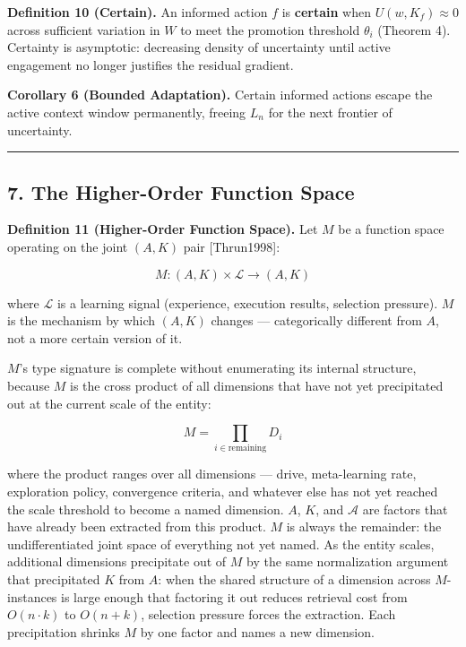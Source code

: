 \documentclass[
]{article}
\begin{document}
\textbf{Definition 10 (Certain).} An informed action \(f\) is
\textbf{certain} when \(U(w, K_f) \approx 0\) across sufficient
variation in \(W\) to meet the promotion threshold \(\theta_i\) (Theorem
4). Certainty is asymptotic: decreasing density of uncertainty until
active engagement no longer justifies the residual gradient.

\textbf{Corollary 6 (Bounded Adaptation).} Certain informed actions
escape the active context window permanently, freeing \(L_n\) for the
next frontier of uncertainty.

\begin{center}\rule{0.5\linewidth}{0.5pt}\end{center}

\subsection{7. The Higher-Order Function
Space}\label{the-higher-order-function-space}

\textbf{Definition 11 (Higher-Order Function Space).} Let \(M\) be a
function space operating on the joint \((A, K)\) pair {[}Thrun1998{]}:

\[M : (A, K) \times \mathcal{L} \rightarrow (A, K)\]

where \(\mathcal{L}\) is a learning signal (experience, execution
results, selection pressure). \(M\) is the mechanism by which
\((A, K)\) changes --- categorically different from \(A\), not a more
certain version of it.

\(M\)'s type signature is complete without enumerating its internal
structure, because \(M\) is the cross product of all dimensions that
have not yet precipitated out at the current scale of the entity:

\[M = \prod_{i \in \text{remaining}} D_i\]

where the product ranges over all dimensions --- drive, meta-learning
rate, exploration policy, convergence criteria, and whatever else has
not yet reached the scale threshold to become a named dimension. \(A\),
\(K\), and \(\mathcal{A}\) are factors that have already been extracted
from this product. \(M\) is always the remainder: the undifferentiated
joint space of everything not yet named. As the entity scales,
additional dimensions precipitate out of \(M\) by the same normalization
argument that precipitated \(K\) from \(A\): when the shared structure
of a dimension across \(M\)-instances is large enough that factoring it
out reduces retrieval cost from \(O(n \cdot k)\) to \(O(n + k)\),
selection pressure forces the extraction. Each precipitation shrinks
\(M\) by one factor and names a new dimension.
\end{document}
